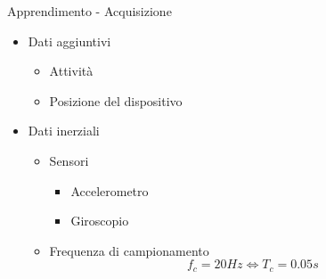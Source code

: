 \begin{tframe}{Apprendimento - Acquisizione}

    \begin{minipage}{0.60\textwidth}

        \begin{itemize}

            \item Dati aggiuntivi
                \begin{itemize}
                    \item Attività
                    \item Posizione del dispositivo
                \end{itemize}

            \item Dati inerziali 
                \begin{itemize}
                    \item Sensori
                        \begin{itemize}
                            \item Accelerometro
                            \item Giroscopio
                        \end{itemize}
                    \item Frequenza di campionamento
                        $$f_c = 20Hz \Longleftrightarrow T_c = 0.05s$$
                \end{itemize}
        \end{itemize}

    \end{minipage}%
    \hfill
    \begin{minipage}{0.35\textwidth}
        

\end{minipage}
\end{tframe}
